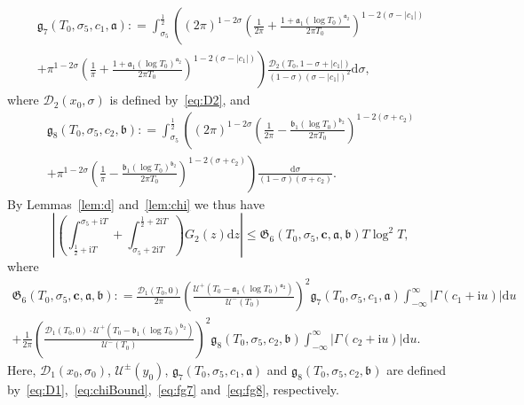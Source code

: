 \documentclass[a4paper,reqno]{amsart}
\theoremstyle{definition}
\newcommand{\de}[0]{\mathrel{\mathop:}=}
\newcommand{\ie}[0]{\mathrm{i}}
\newcommand{\dif}[1]{\mathrm{d}#1}
\begin{document}
\begin{multline}
\label{eq:fg7}
\mathfrak{g}_{7}\left(T_0,\sigma_5,c_1,\bm{\mathfrak{a}}\right) \de \int_{\sigma_5}^{\frac{1}{2}}\left((2\pi)^{1-2\sigma}\left(\frac{1}{2\pi}+\frac{1+\mathfrak{a}_{1}(\log{T_0})^{\mathfrak{a}_2}}{2\pi T_0}\right)^{1-2(\sigma-|c_1|)}\right. \\
\left.+\pi^{1-2\sigma}\left(\frac{1}{\pi}+\frac{1+\mathfrak{a}_1(\log{T_0})^{\mathfrak{a}_2}}{2\pi T_0}\right)^{1-2(\sigma-|c_1|)}\right)\frac{\mathcal{D}_{2}(T_0,1-\sigma+|c_1|)}{(1-\sigma)\left(\sigma-|c_1|\right)^{2}}\dif{\sigma},
\end{multline}
where $\mathcal{D}_2(x_0,\sigma)$ is defined by~\eqref{eq:D2}, and
\begin{multline}
\label{eq:fg8}
\mathfrak{g}_{8}\left(T_0,\sigma_5,c_2,\bm{\mathfrak{b}}\right) \de \int_{\sigma_5}^{\frac{1}{2}}\left((2\pi)^{1-2\sigma}\left(\frac{1}{2\pi}-\frac{\mathfrak{b}_1(\log{T_0})^{\mathfrak{b}_2}}{2\pi T_0}\right)^{1-2(\sigma+c_2)}\right.\\
\left.+\pi^{1-2\sigma}\left(\frac{1}{\pi}-\frac{\mathfrak{b}_1(\log{T_0})^{\mathfrak{b}_2}}{2\pi T_0}\right)^{1-2(\sigma+c_2)}\right)\frac{\dif{\sigma}}{(1-\sigma)(\sigma+c_2)}.
\end{multline}
By Lemmas~\ref{lem:d} and~\ref{lem:chi} we thus have
\begin{equation}
\label{eq:G2res}
\left|\left(\int_{\frac{1}{2}+\ie T}^{\sigma_5+\ie T}+\int_{\sigma_5+2\ie T}^{\frac{1}{2}+2\ie T}\right)G_{2}(z)\dif{z}\right| \leq \mathfrak{G}_{6}\left(T_0,\sigma_5,\bm{c},\bm{\mathfrak{a}},\bm{\mathfrak{b}}\right)T\log^{2}{T},
\end{equation}
where
\begin{multline}
\label{eq:fG6}
\mathfrak{G}_{6}\left(T_0,\sigma_5,\bm{c},\bm{\mathfrak{a}},\bm{\mathfrak{b}}\right) \de \frac{\mathcal{D}_{1}(T_0,0)}{2\pi}\left(\frac{\mathcal{U}^{+}\left(T_0-\mathfrak{a}_{1}(\log{T_0})^{\mathfrak{a}_{2}}\right)}{\mathcal{U}^{-}(T_0)}\right)^{2}\mathfrak{g}_{7}\left(T_0,\sigma_5,c_1,\bm{\mathfrak{a}}\right)\int_{-\infty}^{\infty}\left|\Gamma(c_1+\ie u)\right|\dif{u} \\
+ \frac{1}{2\pi}\left(\frac{\mathcal{D}_{1}(T_0,0)\cdot\mathcal{U}^{+}\left(T_0-\mathfrak{b}_{1}(\log{T_0})^{\mathfrak{b}_{2}}\right)}{\mathcal{U}^{-}(T_0)}\right)^{2}\mathfrak{g}_{8}\left(T_0,\sigma_5,c_2,\bm{\mathfrak{b}}\right)\int_{-\infty}^{\infty}\left|\Gamma(c_2+\ie u)\right|\dif{u}.
\end{multline}
Here, $\mathcal{D}_{1}(x_0,\sigma_0)$, $\mathcal{U}^{\pm}(y_0)$, $\mathfrak{g}_{7}\left(T_0,\sigma_5,c_1,\bm{\mathfrak{a}}\right)$ and $\mathfrak{g}_{8}\left(T_0,\sigma_5,c_2,\bm{\mathfrak{b}}\right)$ are defined by~\eqref{eq:D1},~\eqref{eq:chiBound},~\eqref{eq:fg7} and~\eqref{eq:fg8}, respectively.
\end{document}
